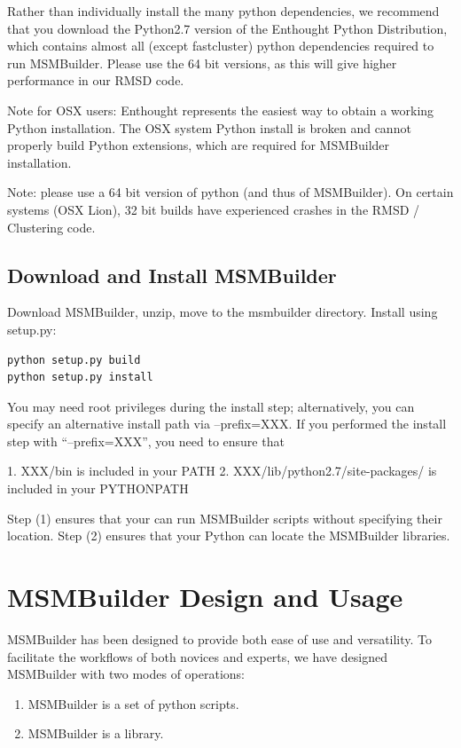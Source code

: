 \documentclass[12pt]{article}
\begin{document}
Rather than individually install the many python dependencies, we recommend that you download the Python2.7 version of the Enthought Python Distribution, which contains almost all (except fastcluster) python dependencies required to run MSMBuilder.  Please use the 64 bit versions, as this will give higher performance in our RMSD code.

Note for OSX users: Enthought represents the easiest way to obtain a working Python installation.  The OSX system Python install is broken and cannot properly build Python extensions, which are required for MSMBuilder installation.

Note: please use a 64 bit version of python (and thus of MSMBuilder).  On certain systems (OSX Lion), 32 bit builds have experienced crashes in the RMSD / Clustering code.

\subsection{Download and Install MSMBuilder}

Download MSMBuilder, unzip, move to the msmbuilder directory.  Install using setup.py:
\begin{verbatim}
python setup.py build
python setup.py install
\end{verbatim}

You may need root privileges during the install step; alternatively, you can specify an alternative install path via --prefix=XXX.  If you performed the install step with “--prefix=XXX”, you need to ensure that

1.  XXX/bin is included in your PATH
2.  XXX/lib/python2.7/site-packages/ is included in your PYTHONPATH

Step (1) ensures that your can run MSMBuilder scripts without specifying their location.  Step (2) ensures that your Python can locate the MSMBuilder libraries.  

\newpage

\section{MSMBuilder Design and Usage}

MSMBuilder has been designed to provide both ease of use and versatility.  To facilitate the workflows of both novices and experts, we have designed MSMBuilder with two modes of operations:

\begin{enumerate}
\item MSMBuilder is a set of python scripts.  
\item MSMBuilder is a library.
\end{enumerate}
\end{document}
